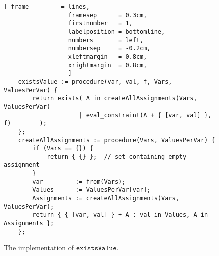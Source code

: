 \begin{figure}[!ht]
\centering
\begin{Verbatim}[ frame         = lines, 
                  framesep      = 0.3cm, 
                  firstnumber   = 1,
                  labelposition = bottomline,
                  numbers       = left,
                  numbersep     = -0.2cm,
                  xleftmargin   = 0.8cm,
                  xrightmargin  = 0.8cm,
                  ]
    existsValue := procedure(var, val, f, Vars, ValuesPerVar) {
        return exists( A in createAllAssignments(Vars, ValuesPerVar) 
                     | eval_constraint(A + { [var, val] }, f)        );
    };
    createAllAssignments := procedure(Vars, ValuesPerVar) {
        if (Vars == {}) {
            return { {} };  // set containing empty assignment
        }
        var         := from(Vars);
        Values      := ValuesPerVar[var];
        Assignments := createAllAssignments(Vars, ValuesPerVar);
        return { { [var, val] } + A : val in Values, A in Assignments };
    };
\end{Verbatim}
\vspace*{-0.3cm}
\caption{The implementation of $\texttt{existsValue}$.}
\label{fig:csp-consistency.stlx:existsValue}
\end{figure}

